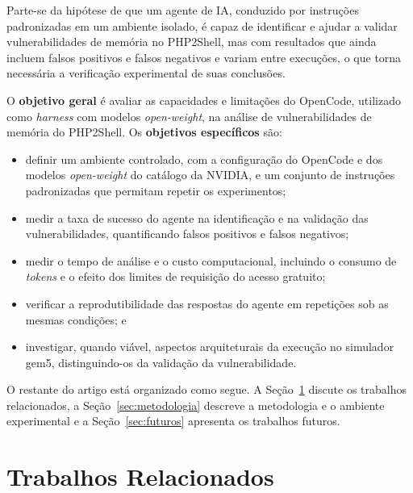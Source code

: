 \documentclass[12pt]{article}
\begin{document}
Parte-se da hipótese de que um agente de IA, conduzido por instruções padronizadas em um ambiente isolado, é capaz de identificar e ajudar a validar vulnerabilidades de memória no PHP2Shell, mas com resultados que ainda incluem falsos positivos e falsos negativos e variam entre execuções, o que torna necessária a verificação experimental de suas conclusões.

O \textbf{objetivo geral} é avaliar as capacidades e limitações do OpenCode, utilizado como \textit{harness} com modelos \textit{open-weight}, na análise de vulnerabilidades de memória do PHP2Shell. Os \textbf{objetivos específicos} são:
\begin{itemize}
    \item definir um ambiente controlado, com a configuração do OpenCode e dos modelos \textit{open-weight} do catálogo da NVIDIA, e um conjunto de instruções padronizadas que permitam repetir os experimentos;
    \item medir a taxa de sucesso do agente na identificação e na validação das vulnerabilidades, quantificando falsos positivos e falsos negativos;
    \item medir o tempo de análise e o custo computacional, incluindo o consumo de \textit{tokens} e o efeito dos limites de requisição do acesso gratuito;
    \item verificar a reprodutibilidade das respostas do agente em repetições sob as mesmas condições; e
    \item investigar, quando viável, aspectos arquiteturais da execução no simulador gem5, distinguindo-os da validação da vulnerabilidade.
\end{itemize}

O restante do artigo está organizado como segue. A Seção~\ref{sec:relacionados} discute os trabalhos relacionados, a Seção~\ref{sec:metodologia} descreve a metodologia e o ambiente experimental e a Seção~\ref{sec:futuros} apresenta os trabalhos futuros.

\section{Trabalhos Relacionados}
\label{sec:relacionados}
\end{document}
